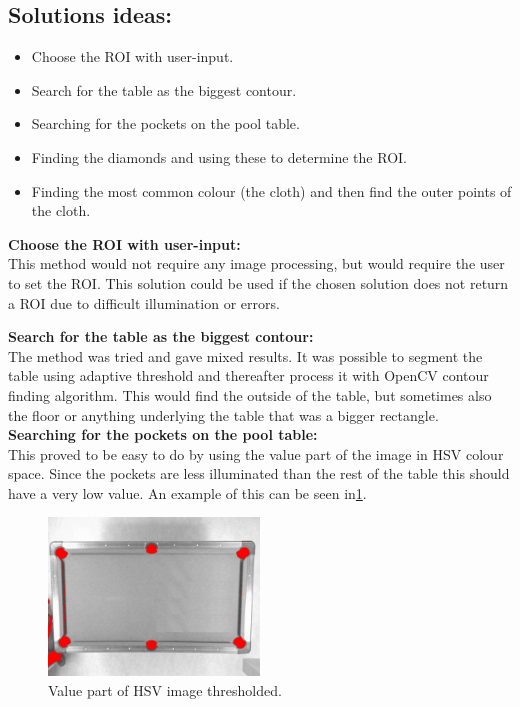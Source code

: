 \subsection{Solutions ideas:}

\begin{itemize}
\setlength{\itemsep}{0mm}
	\item Choose the ROI with user-input.
	\item Search for the table as the biggest contour.
	\item Searching for the pockets on the pool table.
	\item Finding the diamonds and using these to determine the ROI.
	\item Finding the most common colour (the cloth) and then find the outer points of the cloth.
\end{itemize}

\textbf{Choose the ROI with user-input:}\\
This method would not require any image processing, but would require the user to set the ROI. This solution could be used if the chosen solution does not return a ROI due to difficult illumination or errors.

\textbf{Search for the table as the biggest contour:}\\
The method was tried and gave mixed results. It was possible to segment the table using adaptive threshold and thereafter process it with OpenCV \cite{opencv} contour finding algorithm. This would find the outside of the table, but sometimes also the floor or anything underlying the table that was a bigger rectangle.\\

\textbf{Searching for the pockets on the pool table:}\\
This proved to be easy to do by using the value part of the image in HSV colour space. Since the pockets are less illuminated than the rest of the table this should have a very low value. An example of this can be seen in\ref{fig:value_thres}. 

\begin{figure}[H]
\begin{center}
\leavevmode
\includegraphics[width=0.5\textwidth]{images/value_thres}
\end{center}
\caption{Value part of HSV image thresholded.}
\label{fig:value_thres}
\end{figure}

